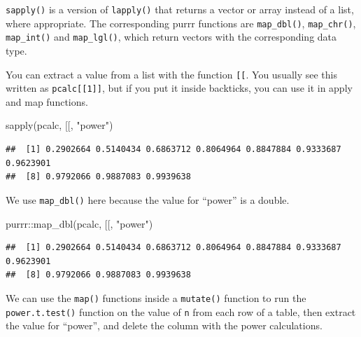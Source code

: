 \documentclass[
  oneside]{book}
\newenvironment{Shaded}{\begin{snugshade}}{\end{snugshade}}
\newcommand{\AttributeTok}[1]{\textcolor[rgb]{0.77,0.63,0.00}{#1}}
\newcommand{\FunctionTok}[1]{\textcolor[rgb]{0.00,0.00,0.00}{#1}}
\newcommand{\NormalTok}[1]{#1}
\newcommand{\SpecialCharTok}[1]{\textcolor[rgb]{0.00,0.00,0.00}{#1}}
\newcommand{\StringTok}[1]{\textcolor[rgb]{0.31,0.60,0.02}{#1}}
\begin{document}
\texttt{sapply()} is a version of \texttt{lapply()} that returns a vector or array instead of a list, where appropriate. The corresponding purrr functions are \texttt{map\_dbl()}, \texttt{map\_chr()}, \texttt{map\_int()} and \texttt{map\_lgl()}, which return vectors with the corresponding data type.

You can extract a value from a list with the function \texttt{{[}{[}}. You usually see this written as \texttt{pcalc{[}{[}1{]}{]}}, but if you put it inside backticks, you can use it in apply and map functions.

\begin{Shaded}
\begin{Highlighting}[]
\FunctionTok{sapply}\NormalTok{(pcalc, }\StringTok{\textasciigrave{}}\AttributeTok{[[}\StringTok{\textasciigrave{}}\NormalTok{, }\StringTok{"power"}\NormalTok{)}
\end{Highlighting}
\end{Shaded}

\begin{verbatim}
##  [1] 0.2902664 0.5140434 0.6863712 0.8064964 0.8847884 0.9333687 0.9623901
##  [8] 0.9792066 0.9887083 0.9939638
\end{verbatim}

We use \texttt{map\_dbl()} here because the value for ``power'' is a double.

\begin{Shaded}
\begin{Highlighting}[]
\NormalTok{purrr}\SpecialCharTok{::}\FunctionTok{map\_dbl}\NormalTok{(pcalc, }\StringTok{\textasciigrave{}}\AttributeTok{[[}\StringTok{\textasciigrave{}}\NormalTok{, }\StringTok{"power"}\NormalTok{)}
\end{Highlighting}
\end{Shaded}

\begin{verbatim}
##  [1] 0.2902664 0.5140434 0.6863712 0.8064964 0.8847884 0.9333687 0.9623901
##  [8] 0.9792066 0.9887083 0.9939638
\end{verbatim}

We can use the \texttt{map()} functions inside a \texttt{mutate()} function to run the \texttt{power.t.test()} function on the value of \texttt{n} from each row of a table, then extract the value for ``power'', and delete the column with the power calculations.
\end{document}

